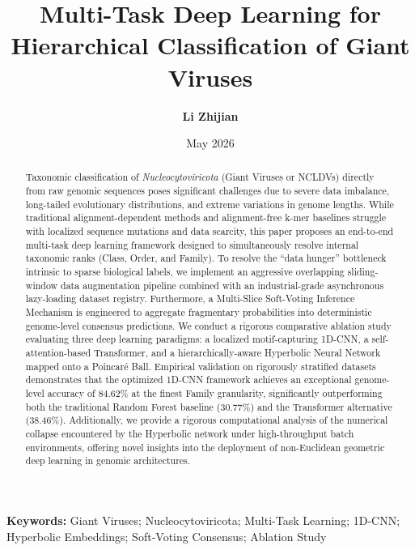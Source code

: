 \documentclass[11pt,a4paper]{article}
\title{\textbf{Multi-Task Deep Learning for Hierarchical Classification of Giant Viruses}}
\author{\textbf{Li Zhijian}}
\date{May 2026}
\begin{document}
\maketitle

\begin{abstract}
Taxonomic classification of \textit{Nucleocytoviricota} (Giant Viruses or NCLDVs) directly from raw genomic sequences poses significant challenges due to severe data imbalance, long-tailed evolutionary distributions, and extreme variations in genome lengths. While traditional alignment-dependent methods and alignment-free k-mer baselines struggle with localized sequence mutations and data scarcity, this paper proposes an end-to-end multi-task deep learning framework designed to simultaneously resolve internal taxonomic ranks (Class, Order, and Family). To resolve the ``data hunger'' bottleneck intrinsic to sparse biological labels, we implement an aggressive overlapping sliding-window data augmentation pipeline combined with an industrial-grade asynchronous lazy-loading dataset registry. Furthermore, a Multi-Slice Soft-Voting Inference Mechanism is engineered to aggregate fragmentary probabilities into deterministic genome-level consensus predictions. We conduct a rigorous comparative ablation study evaluating three deep learning paradigms: a localized motif-capturing 1D-CNN, a self-attention-based Transformer, and a hierarchically-aware Hyperbolic Neural Network mapped onto a Poincaré Ball. Empirical validation on rigorously stratified datasets demonstrates that the optimized 1D-CNN framework achieves an exceptional genome-level accuracy of 84.62\% at the finest Family granularity, significantly outperforming both the traditional Random Forest baseline (30.77\%) and the Transformer alternative (38.46\%). Additionally, we provide a rigorous computational analysis of the numerical collapse encountered by the Hyperbolic network under high-throughput batch environments, offering novel insights into the deployment of non-Euclidean geometric deep learning in genomic architectures.
\end{abstract}

\noindent\textbf{Keywords:} Giant Viruses; Nucleocytoviricota; Multi-Task Learning; 1D-CNN; Hyperbolic Embeddings; Soft-Voting Consensus; Ablation Study

\newpage
\end{document}
